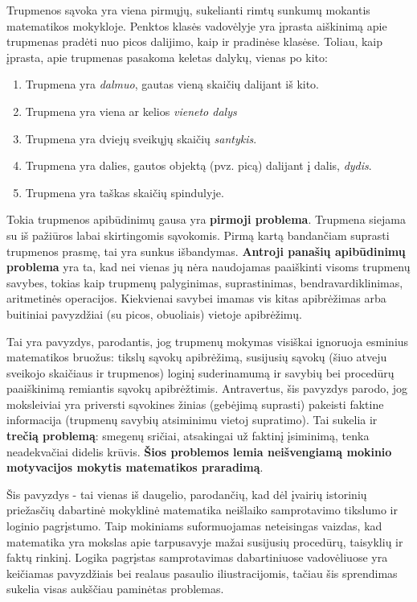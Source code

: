 \documentclass{article}
\begin{document}
Trupmenos sąvoka yra viena pirmųjų, sukelianti rimtų sunkumų mokantis matematikos mokykloje. Penktos klasės vadovėlyje yra įprasta aiškinimą apie trupmenas pradėti nuo picos dalijimo, kaip ir pradinėse klasėse. Toliau, kaip įprasta, apie trupmenas pasakoma keletas dalykų, vienas po kito:

\begin{enumerate}
\item Trupmena yra \textit{dalmuo}, gautas vieną skaičių dalijant iš kito.
\item Trupmena yra viena ar kelios \textit{vieneto dalys}
\item Trupmena yra dviejų sveikųjų skaičių \textit{santykis}.
\item Trupmena yra dalies, gautos objektą (pvz. picą) dalijant į dalis, \textit{dydis}.
\item Trupmena yra taškas skaičių spindulyje.
\end{enumerate}

Tokia trupmenos apibūdinimų gausa yra \textbf{pirmoji problema}. Trupmena siejama su iš pažiūros labai skirtingomis sąvokomis. Pirmą kartą bandančiam suprasti trupmenos prasmę, tai yra sunkus išbandymas. \textbf{Antroji panašių apibūdinimų problema} yra ta, kad nei vienas jų nėra naudojamas paaiškinti visoms trupmenų savybes, tokias kaip trupmenų palyginimas, suprastinimas, bendravardiklinimas, aritmetinės operacijos. Kiekvienai savybei imamas vis kitas apibrėžimas arba buitiniai pavyzdžiai (su picos, obuoliais) vietoje apibrėžimų. 

Tai yra pavyzdys, parodantis, jog trupmenų mokymas visiškai ignoruoja esminius matematikos bruožus: tikslų sąvokų apibrėžimą, susijusių sąvokų (šiuo atveju sveikojo skaičiaus ir trupmenos) loginį suderinamumą ir savybių bei procedūrų paaiškinimą remiantis sąvokų apibrėžtimis. Antravertus, šis pavyzdys parodo, jog moksleiviai yra priversti sąvokines žinias (gebėjimą suprasti) pakeisti faktine informacija (trupmenų savybių atsiminimu vietoj supratimo). Tai sukelia ir \textbf{trečią problemą}: smegenų sričiai, atsakingai už faktinį įsiminimą, tenka neadekvačiai didelis krūvis. \textbf{Šios problemos lemia neišvengiamą mokinio motyvacijos mokytis matematikos praradimą}.

Šis pavyzdys - tai vienas iš daugelio, parodančių, kad dėl įvairių istorinių priežasčių dabartinė mokyklinė matematika neišlaiko samprotavimo  tikslumo  ir loginio  pagrįstumo. Taip mokiniams suformuojamas neteisingas vaizdas, kad matematika yra mokslas apie tarpusavyje mažai susijusių procedūrų, taisyklių ir faktų rinkinį. Logika pagrįstas samprotavimas dabartiniuose vadovėliuose yra keičiamas pavyzdžiais bei realaus pasaulio iliustracijomis, tačiau šis sprendimas sukelia visas aukščiau paminėtas problemas.
\end{document}

